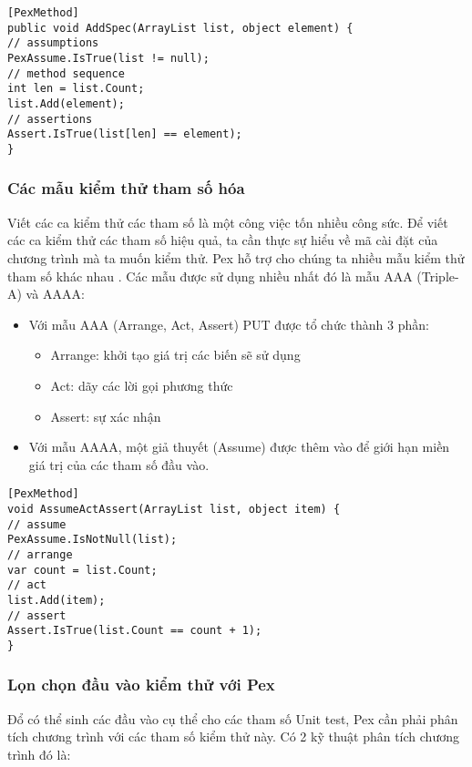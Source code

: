 \begin{lstlisting}[language={[Sharp]C}, caption={Ca kiểm thử tham số sử dụng Pex}, label={Script}]
[PexMethod]
public void AddSpec(ArrayList list, object element) {
// assumptions
PexAssume.IsTrue(list != null);
// method sequence
int len = list.Count; 
list.Add(element);
// assertions
Assert.IsTrue(list[len] == element);
}
\end{lstlisting}


\subsubsection*{Các mẫu kiểm thử tham số hóa}
Viết các ca kiểm thử các tham số là một công việc tốn nhiều công sức. Để viết các ca kiểm thử các tham số hiệu quả, ta cần thực sự hiểu về mã cài đặt của chương trình mà ta muốn kiểm thử. Pex hỗ trợ cho chúng ta nhiều mẫu kiểm thử tham số khác nhau \cite{de2008parameterized}. Các mẫu được sử dụng nhiều nhất đó là mẫu AAA (Triple-A) và AAAA:
\begin{itemize}
	\item Với mẫu AAA (Arrange, Act, Assert) PUT được tổ chức thành 3 phần:
	\begin{itemize}
		\item Arrange: khởi tạo giá trị các biến sẽ sử dụng
		\item Act: dãy các lời gọi phương thức
		\item Assert: sự xác nhận
	\end{itemize}
	\item Với mẫu AAAA, một giả thuyết (Assume) được thêm vào để giới hạn miền giá trị của các tham số đầu vào.
\end{itemize}

\begin{lstlisting}[language={[Sharp]C}, caption={Mầu kiềm thử tham số hóa AAAA}, label={Script}]
[PexMethod]
void AssumeActAssert(ArrayList list, object item) { 
// assume
PexAssume.IsNotNull(list);
// arrange
var count = list.Count;
// act
list.Add(item);
// assert
Assert.IsTrue(list.Count == count + 1);
}
\end{lstlisting}

\subsubsection*{Lọn chọn đầu vào kiểm thử với Pex}
Đổ có thể sinh các đầu vào cụ thể cho các tham số Unit test, Pex cần phải phân tích chương trình với các tham số kiểm thử này. Có 2 kỹ thuật phân tích chương trình đó là:

